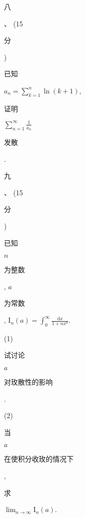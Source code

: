 \documentclass[10pt]{article}
\begin{document}
\begin{CJK}{UTF8}{mj}八\end{CJK}、 (15 \begin{CJK}{UTF8}{mj}分\end{CJK}) \begin{CJK}{UTF8}{mj}已知\end{CJK} $a_{n}=\sum_{k=1}^{n} \ln (k+1)$, \begin{CJK}{UTF8}{mj}证明\end{CJK} $\sum_{n=1}^{\infty} \frac{1}{a_{n}}$ \begin{CJK}{UTF8}{mj}发散\end{CJK}.

\begin{CJK}{UTF8}{mj}九\end{CJK}、 (15 \begin{CJK}{UTF8}{mj}分\end{CJK}) \begin{CJK}{UTF8}{mj}已知\end{CJK} $n$ \begin{CJK}{UTF8}{mj}为整数\end{CJK}, $a$ \begin{CJK}{UTF8}{mj}为常数\end{CJK}, $\mathrm{I}_{n}(a)=\int_{0}^{\infty} \frac{\mathrm{d} x}{1+n x^{a}}$.

(1) \begin{CJK}{UTF8}{mj}试讨论\end{CJK} $a$ \begin{CJK}{UTF8}{mj}对玫散性的影响\end{CJK}.

(2) \begin{CJK}{UTF8}{mj}当\end{CJK} $a$ \begin{CJK}{UTF8}{mj}在使积分收玫的情况下\end{CJK}, \begin{CJK}{UTF8}{mj}求\end{CJK} $\lim _{n \rightarrow \infty} \mathrm{I}_{n}(a)$.
\end{document}
